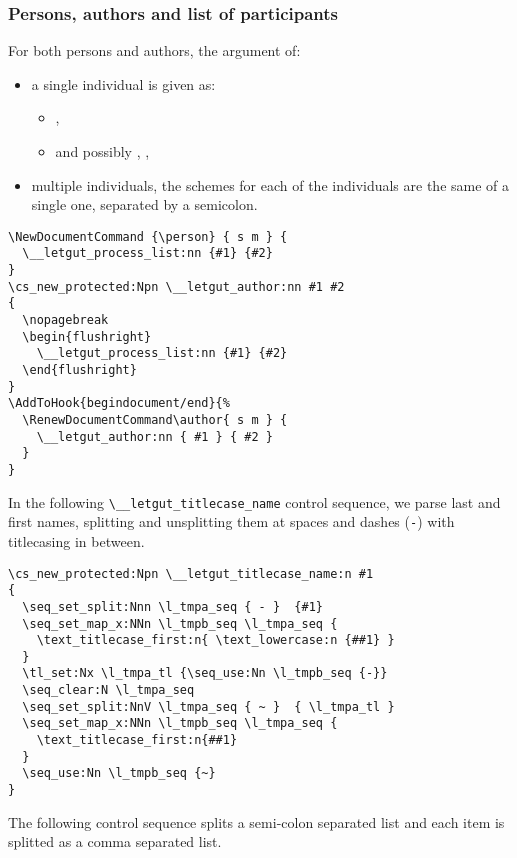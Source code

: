 \documentclass{letgut}
\begin{document}
\subsubsection{Persons, authors and list of participants}
\label{ImplementationDocumentcommandsPersonsandauthors-h5sg55h0jlj0}
For both persons and authors, the argument of:
\begin{itemize}
\item a single individual is given as:
\begin{itemize}
\item {}, 
\item and possibly , , 
\end{itemize}
\item multiple individuals, the schemes for each of the individuals are the same of
a single one, separated by a semicolon.
\end{itemize}

\begin{lstlisting}
\NewDocumentCommand {\person} { s m } {
  \__letgut_process_list:nn {#1} {#2}
}
\cs_new_protected:Npn \__letgut_author:nn #1 #2
{
  \nopagebreak
  \begin{flushright}
    \__letgut_process_list:nn {#1} {#2}
  \end{flushright}
}
\AddToHook{begindocument/end}{%
  \RenewDocumentCommand\author{ s m } {
    \__letgut_author:nn { #1 } { #2 }
  }
}
\end{lstlisting}

In the following \lstinline+\__letgut_titlecase_name+ control sequence, we parse last and
first names, splitting and unsplitting them at spaces and dashes (\lstinline+-+) with
titlecasing in between.

\begin{lstlisting}
\cs_new_protected:Npn \__letgut_titlecase_name:n #1
{
  \seq_set_split:Nnn \l_tmpa_seq { - }  {#1}
  \seq_set_map_x:NNn \l_tmpb_seq \l_tmpa_seq {
    \text_titlecase_first:n{ \text_lowercase:n {##1} }
  }
  \tl_set:Nx \l_tmpa_tl {\seq_use:Nn \l_tmpb_seq {-}}
  \seq_clear:N \l_tmpa_seq
  \seq_set_split:NnV \l_tmpa_seq { ~ }  { \l_tmpa_tl }
  \seq_set_map_x:NNn \l_tmpb_seq \l_tmpa_seq {
    \text_titlecase_first:n{##1}
  }
  \seq_use:Nn \l_tmpb_seq {~}
}
\end{lstlisting}

The following control sequence splits a semi-colon separated list and each item
is splitted as a comma separated list.
\end{document}

